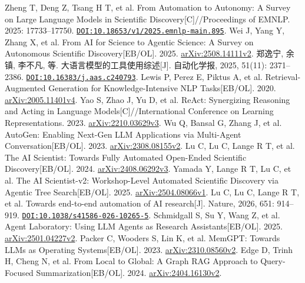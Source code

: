  Zheng T, Deng Z, Tsang H T, et al. From Automation to Autonomy: A Survey on Large Language Models in Scientific Discovery[C]//Proceedings of EMNLP. 2025: 17733--17750. \href{https://doi.org/10.18653/v1/2025.emnlp-main.895}{\nolinkurl{DOI:10.18653/v1/2025.emnlp-main.895}}.
 Wei J, Yang Y, Zhang X, et al. From AI for Science to Agentic Science: A Survey on Autonomous Scientific Discovery[EB/OL]. 2025. \href{https://arxiv.org/abs/2508.14111v2}{arXiv:2508.14111v2}.
 郑逸宁, 余镇, 李不凡, 等. 大语言模型的工具使用综述[J]. 自动化学报, 2025, 51(11): 2371--2386. \href{https://doi.org/10.16383/j.aas.c240793}{\nolinkurl{DOI:10.16383/j.aas.c240793}}.
 Lewis P, Perez E, Piktus A, et al. Retrieval-Augmented Generation for Knowledge-Intensive NLP Tasks[EB/OL]. 2020. \href{https://arxiv.org/abs/2005.11401v4}{arXiv:2005.11401v4}.
 Yao S, Zhao J, Yu D, et al. ReAct: Synergizing Reasoning and Acting in Language Models[C]//International Conference on Learning Representations. 2023. \href{https://arxiv.org/abs/2210.03629v3}{arXiv:2210.03629v3}.
 Wu Q, Bansal G, Zhang J, et al. AutoGen: Enabling Next-Gen LLM Applications via Multi-Agent Conversation[EB/OL]. 2023. \href{https://arxiv.org/abs/2308.08155v2}{arXiv:2308.08155v2}.
 Lu C, Lu C, Lange R T, et al. The AI Scientist: Towards Fully Automated Open-Ended Scientific Discovery[EB/OL]. 2024. \href{https://arxiv.org/abs/2408.06292v3}{arXiv:2408.06292v3}.
 Yamada Y, Lange R T, Lu C, et al. The AI Scientist-v2: Workshop-Level Automated Scientific Discovery via Agentic Tree Search[EB/OL]. 2025. \href{https://arxiv.org/abs/2504.08066v1}{arXiv:2504.08066v1}.
 Lu C, Lu C, Lange R T, et al. Towards end-to-end automation of AI research[J]. Nature, 2026, 651: 914--919. \href{https://doi.org/10.1038/s41586-026-10265-5}{\nolinkurl{DOI:10.1038/s41586-026-10265-5}}.
 Schmidgall S, Su Y, Wang Z, et al. Agent Laboratory: Using LLM Agents as Research Assistants[EB/OL]. 2025. \href{https://arxiv.org/abs/2501.04227v2}{arXiv:2501.04227v2}.
 Packer C, Wooders S, Lin K, et al. MemGPT: Towards LLMs as Operating Systems[EB/OL]. 2023. \href{https://arxiv.org/abs/2310.08560v2}{arXiv:2310.08560v2}.
 Edge D, Trinh H, Cheng N, et al. From Local to Global: A Graph RAG Approach to Query-Focused Summarization[EB/OL]. 2024. \href{https://arxiv.org/abs/2404.16130v2}{arXiv:2404.16130v2}.
